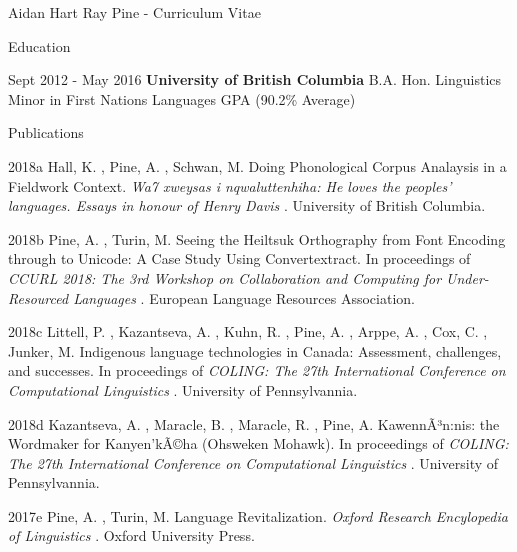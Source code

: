 \documentclass[12pt]{letter}
\date{}
\begin{document}
        \begin{cv}{ Aidan Hart Ray Pine  \space - \space   Curriculum Vitae}
        \vspace{1mm}

                    \begin{cvlist}{Education}
                \item[Sept 2012 - May 2016] \textbf{University of British Columbia}
            \newline B.A. Hon. Linguistics
            \newline Minor in First Nations Languages
             GPA (90.2\% Average)
            \end{cvlist}
        
        
        \begin{cvlist}{Publications}
                                                \item[2018a]  Hall,  K. ,  Pine,  A. ,  Schwan,  M.   Doing Phonological Corpus Analaysis in a Fieldwork Context. \textit{ Wa7 xweysas i nqwaluttenhiha: He loves the peoples' languages. Essays in honour of Henry Davis }. University of British Columbia.  
                                                            \item[2018b]  Pine,  A. ,  Turin,  M.   Seeing the Heiltsuk Orthography from Font Encoding through to Unicode: A Case Study Using Convertextract. In proceedings of \textit{ CCURL 2018: The 3rd Workshop on Collaboration and Computing for Under-Resourced Languages }. European Language Resources Association.  
                                                            \item[2018c]  Littell,  P. ,  Kazantseva,  A. ,  Kuhn,  R. ,  Pine,  A. ,  Arppe,  A. ,  Cox,  C. ,  Junker,  M.   Indigenous language technologies in Canada: Assessment, challenges, and successes. In proceedings of \textit{ COLING: The 27th International Conference on Computational Linguistics }. University of Pennsylvannia.  
                                                            \item[2018d]  Kazantseva,  A. ,  Maracle,  B. ,  Maracle,  R. ,  Pine,  A.   KawennÃ³n:nis: the Wordmaker for Kanyen'kÃ©ha (Ohsweken Mohawk). In proceedings of \textit{ COLING: The 27th International Conference on Computational Linguistics }. University of Pennsylvannia.  
                                                            \item[2017e]  Pine,  A. ,  Turin,  M.   Language Revitalization. \textit{ Oxford Research Encylopedia of Linguistics }. Oxford University Press.  

\end{cvlist}
\end{cv}
\end{document}
